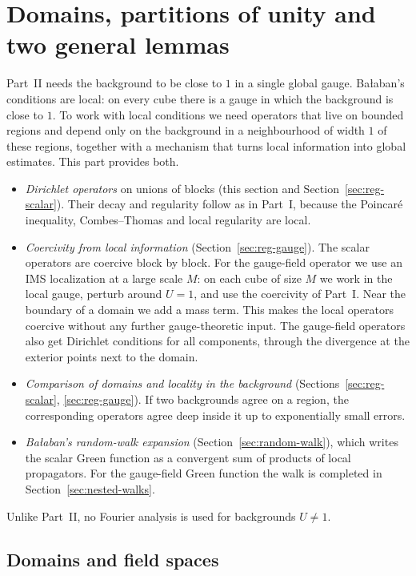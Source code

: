 \section{Domains, partitions of unity and two general lemmas}\label{sec:domains}

Part~II needs the background to be close to $1$ in a single global gauge. Ba\l aban's conditions are local: on every cube there is a gauge in which the background is close to $1$. To work with local conditions we need operators that live on bounded regions and depend only on the background in a neighbourhood of width $1$ of these regions, together with a mechanism that turns local information into global estimates. This part provides both.
\begin{itemize}
\item \emph{Dirichlet operators} on unions of blocks (this section and Section~\ref{sec:reg-scalar}). Their decay and regularity follow as in Part~I, because the Poincar\'e inequality, Combes--Thomas and local regularity are local.
\item \emph{Coercivity from local information} (Section~\ref{sec:reg-gauge}). The scalar operators are coercive block by block. For the gauge-field operator we use an IMS localization at a large scale $M$: on each cube of size $M$ we work in the local gauge, perturb around $U=1$, and use the coercivity of Part~I. Near the boundary of a domain we add a mass term. This makes the local operators coercive without any further gauge-theoretic input. The gauge-field operators also get Dirichlet conditions for all components, through the divergence at the exterior points next to the domain.
\item \emph{Comparison of domains and locality in the background} (Sections~\ref{sec:reg-scalar}, \ref{sec:reg-gauge}). If two backgrounds agree on a region, the corresponding operators agree deep inside it up to exponentially small errors.
\item \emph{Ba\l aban's random-walk expansion} (Section~\ref{sec:random-walk}), which writes the scalar Green function as a convergent sum of products of local propagators. For the gauge-field Green function the walk is completed in Section~\ref{sec:nested-walks}.
\end{itemize}
Unlike Part~II, no Fourier analysis is used for backgrounds $U\neq1$.

\subsection{Domains and field spaces}

